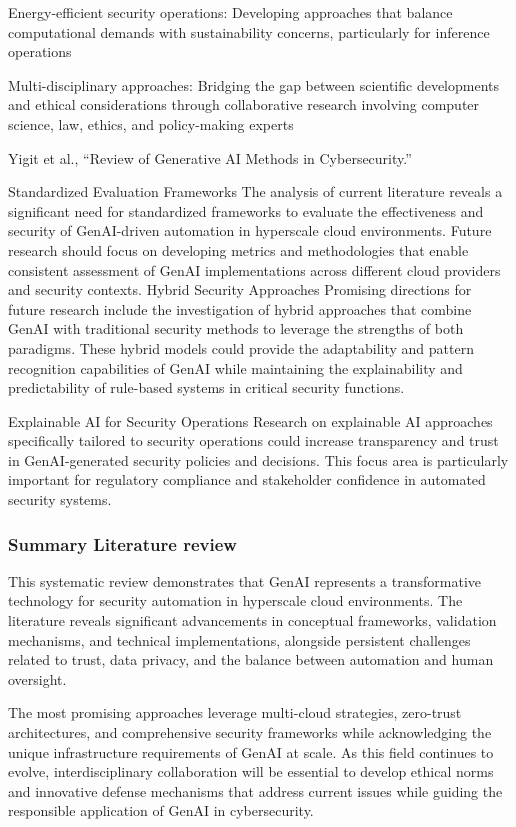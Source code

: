 Energy-efficient security operations: Developing approaches that balance computational demands with sustainability concerns, particularly for inference operations

Multi-disciplinary approaches: Bridging the gap between scientific developments and ethical considerations through collaborative research involving computer science, law, ethics, and policy-making experts

Yigit et al., “Review of Generative AI Methods in Cybersecurity.”

Standardized Evaluation Frameworks
The analysis of current literature reveals a significant need for standardized frameworks to evaluate the effectiveness and security of GenAI-driven automation in hyperscale cloud environments. Future research should focus on developing metrics and methodologies that enable consistent assessment of GenAI implementations across different cloud providers and security contexts.
Hybrid Security Approaches
Promising directions for future research include the investigation of hybrid approaches that combine GenAI with traditional security methods to leverage the strengths of both paradigms. These hybrid models could provide the adaptability and pattern recognition capabilities of GenAI while maintaining the explainability and predictability of rule-based systems in critical security functions.

Explainable AI for Security Operations
Research on explainable AI approaches specifically tailored to security operations could increase transparency and trust in GenAI-generated security policies and decisions. This focus area is particularly important for regulatory compliance and stakeholder confidence in automated security systems.

\subsubsection{Summary Literature review} %
\label{sec:Summary Literature review}

This systematic review demonstrates that GenAI represents a transformative technology for security automation in hyperscale cloud environments. The literature reveals significant advancements in conceptual frameworks, validation mechanisms, and technical implementations, alongside persistent challenges related to trust, data privacy, and the balance between automation and human oversight.

The most promising approaches leverage multi-cloud strategies, zero-trust architectures, and comprehensive security frameworks while acknowledging the unique infrastructure requirements of GenAI at scale. As this field continues to evolve, interdisciplinary collaboration will be essential to develop ethical norms and innovative defense mechanisms that address current issues while guiding the responsible application of GenAI in cybersecurity.

